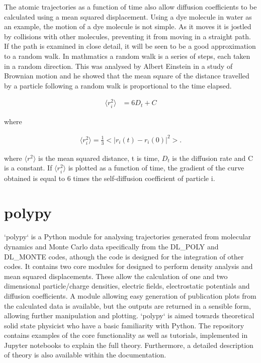 \documentclass[journal=jacsat,manuscript=article]{achemso}
\begin{document}
The atomic trajectories as a function of time also allow diffusion coefficients to be calculated using a mean squared displacement. Using a dye molecule in water as an example, the motion of a dye molecule is not simple. As it moves it is jostled by collisions with other molecules, preventing it from moving in a straight path. If the path is examined in close detail, it will be seen to be a good approximation to a random walk. In mathmatics a random walk is a series of steps, each taken in a random direction. This was analysed by Albert Einstein in a study of Brownian motion and he showed that the mean square of the distance travelled by a particle following a random walk is proportional to the time elapsed. 

\begin{align}
\Big \langle r_{i}^{2} \big \rangle & = 6 D_t + C 
\end{align}

where 

\begin{align}
\Big \langle r_{i}^{2} \big \rangle = \frac{1}{3} \Big< | r_{i}(t) - r_{i}(0) |^2 \Big>.
\end{align}


where $\Big \langle r^2 \big \rangle$ is the mean squared distance, t is time, $D_t$ is the diffusion rate and C is a constant. If $\Big \langle r_{i}^{2} \big \rangle$ is plotted as a function of time, the gradient of the curve obtained is equal to 6 times the self-diffusion coefficient of particle i.

\section{polypy}

`polypy` is a Python module for analysing trajectories generated from molecular dynamics and Monte Carlo data specifically from the DL\_POLY and DL\_MONTE codes, athough the code is designed for the integration of other codes.
It contains two core modules for designed to perform density analysis and mean squared displacements.
These allow the calculation of one and two dimensional particle/charge densities, electric fields, electrostatic potentials and diffusion coefficients. A module allowing easy generation of publication plots from the calculated data is available, but the outputs are returned in a sensible form, allowing further manipulation and plotting.
`polypy` is aimed towards theoretical solid state physicist who have a basic familiarity with Python.
The repository contains examples of the core functionality as well as tutorials, implemented in Jupyter notebooks to explain the full theory.
Furthermore, a detailed description of theory is also available within the documentation.
\end{document}
